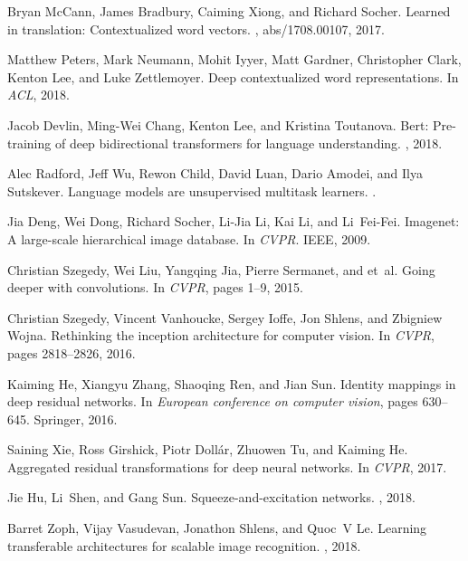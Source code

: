 \documentclass{article}
\begin{document}
{\small
}
\begin{thebibliography}{10}

Bryan McCann, James Bradbury, Caiming Xiong, and Richard Socher.
\newblock Learned in translation: Contextualized word vectors.
, abs/1708.00107, 2017.

Matthew Peters, Mark Neumann, Mohit Iyyer, Matt Gardner, Christopher Clark,
  Kenton Lee, and Luke Zettlemoyer.
\newblock Deep contextualized word representations.
\newblock In {\em ACL}, 2018.

Jacob Devlin, Ming-Wei Chang, Kenton Lee, and Kristina Toutanova.
\newblock Bert: Pre-training of deep bidirectional transformers for language
  understanding.
, 2018.

Alec Radford, Jeff Wu, Rewon Child, David Luan, Dario Amodei, and Ilya
  Sutskever.
\newblock Language models are unsupervised multitask learners.
.

Jia Deng, Wei Dong, Richard Socher, Li-Jia Li, Kai Li, and Li~Fei-Fei.
\newblock Imagenet: A large-scale hierarchical image database.
\newblock In {\em CVPR}. IEEE, 2009.

Christian Szegedy, Wei Liu, Yangqing Jia, Pierre Sermanet, and et~al.
\newblock Going deeper with convolutions.
\newblock In {\em CVPR}, pages 1--9, 2015.

Christian Szegedy, Vincent Vanhoucke, Sergey Ioffe, Jon Shlens, and Zbigniew
  Wojna.
\newblock Rethinking the inception architecture for computer vision.
\newblock In {\em CVPR}, pages 2818--2826, 2016.

Kaiming He, Xiangyu Zhang, Shaoqing Ren, and Jian Sun.
\newblock Identity mappings in deep residual networks.
\newblock In {\em European conference on computer vision}, pages 630--645.
  Springer, 2016.

Saining Xie, Ross Girshick, Piotr Doll{\'a}r, Zhuowen Tu, and Kaiming He.
\newblock Aggregated residual transformations for deep neural networks.
\newblock In {\em CVPR}, 2017.

Jie Hu, Li~Shen, and Gang Sun.
\newblock Squeeze-and-excitation networks.
, 2018.

Barret Zoph, Vijay Vasudevan, Jonathon Shlens, and Quoc~V Le.
\newblock Learning transferable architectures for scalable image recognition.
, 2018.


\end{thebibliography}
\end{document}
